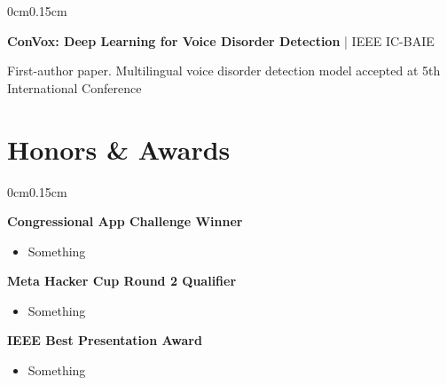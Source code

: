 \documentclass[10pt, letterpaper]{article}
\newenvironment{highlights}{
    \begin{itemize}[topsep=0pt, parsep=0pt, partopsep=0pt, itemsep=0pt, leftmargin=0.6cm]
}{
    \end{itemize}
}
\newenvironment{onecolentry}{
    \begin{adjustwidth}{0cm}{0.15cm}
}{
    \end{adjustwidth}
}
\begin{document}
    \vspace{0.1cm}

    \begin{onecolentry}
        \textbf{ConVox: Deep Learning for Voice Disorder Detection} | IEEE IC-BAIE
        
        \vspace{0.05cm}
        First-author paper. Multilingual voice disorder detection model accepted at 5th International Conference
    \end{onecolentry}

    \vspace{0.05cm}
    \section{Honors \& Awards}
    \vspace{0.05cm}

    \begin{onecolentry}
        \textbf{Congressional App Challenge Winner}
        \begin{highlights}
            \item Something
        \end{highlights}
        \vspace{0.1cm}
        \textbf{Meta Hacker Cup Round 2 Qualifier}
        \begin{highlights}
            \item Something
        \end{highlights}
        \vspace{0.1cm}
        \textbf{IEEE Best Presentation Award}
        \begin{highlights}
            \item Something
        \end{highlights}
    \end{onecolentry}
\end{document}

